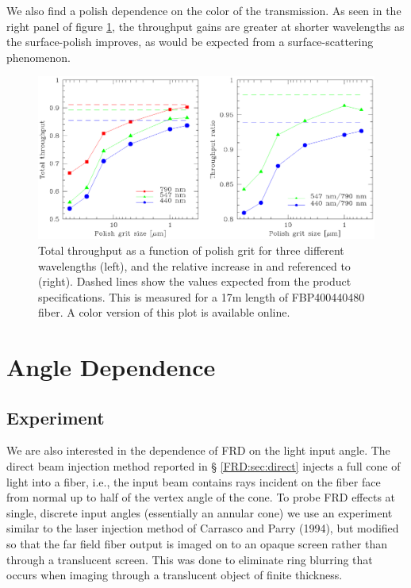 We also find a polish dependence on the color of the transmission.  As
seen in the right panel of figure \ref{fig:tputwave}, the throughput
gains are greater at shorter wavelengths as the surface-polish
improves, as would be expected from a surface-scattering phenomenon.

\begin{figure}[ht]
  \centering
  \includegraphics[width=\textwidth, trim=0 4in 0 0, clip=true]{FRD/figs/tput.eps}
  \caption{\fixspacing\label{fig:tputwave} Total throughput as a function of
    polish grit for three different wavelengths (left), and the relative
    increase in \filtB and \filty referenced to \filtI (right). Dashed
    lines show the values expected from the product
    specifications. This is measured for a 17m length of FBP400440480
    fiber. A color version of this plot is available online.}
\end{figure}

\section{Angle Dependence}
\label{FRD:sec:angle}
\subsection{Experiment}
We are also interested in the dependence of FRD on the light input
angle. The direct beam injection method reported in \S
\ref{FRD:sec:direct} injects a full cone of light into a fiber, i.e., 
the input beam contains rays incident on the fiber face from normal up
to half of the vertex angle of the cone.  To probe FRD effects at
single, discrete input angles (essentially an annular cone) we use an
experiment similar to the laser injection method of Carrasco and
Parry (1994)\cite{Carrasco, Haynes11}, but modified so that the far
field fiber output is imaged on to an opaque screen rather than through a
translucent screen. This was done to eliminate ring blurring that
occurs when imaging through a translucent object of finite thickness.

